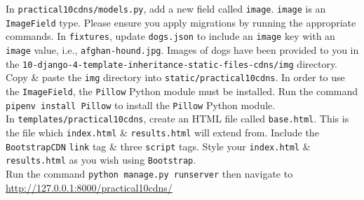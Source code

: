 \documentclass{article}
\begin{document}
In \texttt{practical10cdns/models.py}, add a new field called \texttt{image}. \texttt{image} is an \texttt{ImageField} type. Please ensure you apply migrations by running the appropriate commands. In \texttt{fixtures}, update \texttt{dogs.json} to include an \texttt{image} key with an \texttt{image} value, i.e., \texttt{afghan-hound.jpg}. Images of dogs have been provided to you in the \texttt{10-django-4-template-inheritance-static-files-cdns/img} directory. Copy \& paste the \texttt{img} directory into \texttt{static/practical10cdns}. In order to use the \texttt{ImageField}, the \texttt{Pillow} Python module must be installed. Run the command \texttt{pipenv install Pillow} to install the \texttt{Pillow} Python module. \\

In \texttt{templates/practical10cdns}, create an HTML file called \texttt{base.html}. This is the file which \texttt{index.html} \& \texttt{results.html} will extend from. Include the \texttt{BootstrapCDN} \texttt{link} tag \& three \texttt{script} tags. Style your \texttt{index.html} \& \texttt{results.html} as you wish using \texttt{Bootstrap}. \\

Run the command \texttt{python manage.py runserver} then navigate to \href{http://127.0.0.1:8000/practical10cdns/}{http://127.0.0.1:8000/practical10cdns/} 
\end{document}
